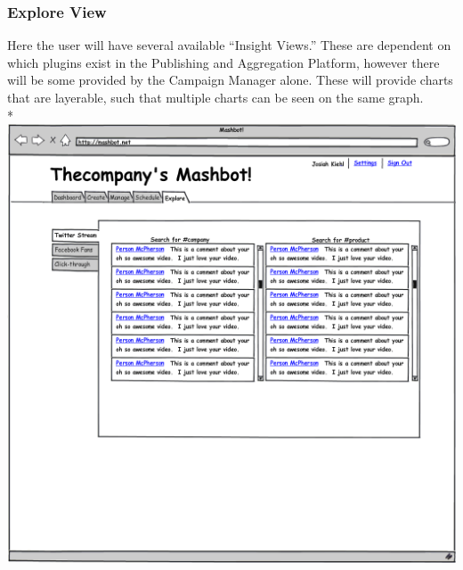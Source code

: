 \documentclass{article}
\begin{document}
\subsubsection{Explore View}
 Here the user will have several available ``Insight Views.''  These are dependent on which plugins exist in the Publishing and Aggregation Platform, however there will be some provided by the Campaign Manager alone.  These will provide charts that are layerable, such that multiple charts can be seen on the same graph. \\*
  \includegraphics[width=\textwidth]{../mockups/explore-twitter.png}
\end{document}
